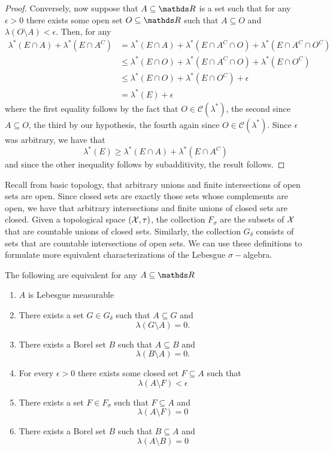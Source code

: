 \begin{proof}
Conversely, now suppose that $A\subseteq\R$ is a set such that for
any $\epsilon>0$ there exists some open set $O\subseteq\R$ such
that $A\subseteq O$ and $\lambda\left(O\setminus A\right)<\epsilon.$
Then, for any 
\begin{align*}
\lambda^{*}\left(E\cap A\right)+\lambda^{*}\left(E\cap A^{C}\right) & =\lambda^{*}\left(E\cap A\right)+\lambda^{*}\left(E\cap A^{C}\cap O\right)+\lambda^{*}\left(E\cap A^{C}\cap O^{C}\right)\\
 & \leq\lambda^{*}\left(E\cap O\right)+\lambda^{*}\left(E\cap A^{C}\cap O\right)+\lambda^{*}\left(E\cap O^{C}\right)\\
 & \leq\lambda^{*}\left(E\cap O\right)+\lambda^{*}\left(E\cap O^{C}\right)+\epsilon\\
 & =\lambda^{*}\left(E\right)+\epsilon
\end{align*}
where the first equality follows by the fact that $O\in\mathcal{C}\left(\lambda^{*}\right)$,
the second since $A\subseteq O$, the third by our hypothesis, the
fourth again since $O\in\mathcal{C}\left(\lambda^{*}\right)$. Since
$\epsilon$ was arbitrary, we have that
\[
\lambda^{*}\left(E\right)\geq\lambda^{*}\left(E\cap A\right)+\lambda^{*}\left(E\cap A^{C}\right)
\]
and since the other inequality follows by subadditivity, the result
follows.
\end{proof}
Recall from basic topology, that arbitrary unions and finite intersections
of open sets are open. Since closed sets are exactly those sets whose
complements are open, we have that arbitrary intersections and finite
unions of closed sets are closed. Given a topological space $\left(\mathcal{X},\tau\right)$,
the collection $F_{\sigma}$ are the subsets of $\mathcal{X}$ that are countable
unions of closed sets. Similarly, the collection $G_{\delta}$ consists
of sets that are countable intersections of open sets. We can use
these definitions to formulate more equivalent characterizations of
the Lebesgue $\sigma-$algebra.
\begin{prop}
\label{prop:equivalentLebesgueMeasurability}The following are equivalent
for any $A\subseteq\R$

\begin{enumerate}[label=(\roman*),leftmargin=.1\linewidth,rightmargin=.4\linewidth]
\item $A$ is Lebesgue measurable
\item There exists a set  $G \in G_{\delta}$ such that $A \subseteq G$ and 
\[
	\lambda\left(G\setminus A\right) = 0.
\]
\item There exists a Borel set $B$ such that $A \subseteq B$ and 
\[
	\lambda\left(B\setminus A\right) = 0.
\]
\item For every $\epsilon > 0$ there exists some closed set $F \subseteq A$ such that 
\[
	\lambda\left(A \setminus F\right) < \epsilon
\]
\item There exists a set $F \in F_{\sigma}$ such that $F \subseteq A$ and 
\[
	\lambda\left(A\setminus F\right)= 0
\]
\item There exists a Borel set $B$ such that $B\subseteq A$ and 
\[
	\lambda\left(A\setminus B\right) = 0
\]
\end{enumerate}
\end{prop}

